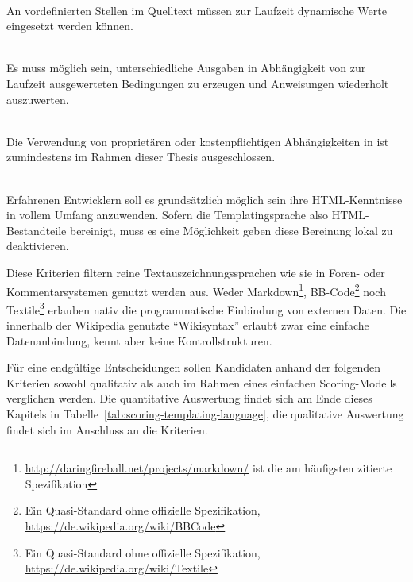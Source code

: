 \begin{description}[noitemsep]
\item[Datenanbindung] \hfill \\
  An vordefinierten Stellen im Quelltext müssen zur Laufzeit dynamische Werte eingesetzt werden können.
\item[Kontrollstrukturen] \hfill \\
  Es muss möglich sein, unterschiedliche Ausgaben in Abhängigkeit von zur Laufzeit ausgewerteten Bedingungen zu erzeugen und Anweisungen wiederholt auszuwerten.
\item[Freie Verfügbarkeit] \hfill \\
  Die Verwendung von proprietären oder kostenpflichtigen Abhängigkeiten in \idename{} ist zumindestens im Rahmen dieser Thesis ausgeschlossen.
\item[Einbettung von reinem HTML] \hfill \\
  Erfahrenen Entwicklern soll es grundsätzlich möglich sein ihre HTML-Kennt\-nisse in vollem Umfang anzuwenden. Sofern die Templatingsprache also HTML-Be\-stand\-teile bereinigt, muss es eine Möglichkeit geben diese Bereinung lokal zu deaktivieren.
\end{description}

Diese Kriterien filtern reine Textauszeichnungssprachen wie sie in Foren- oder Kommentarsystemen genutzt werden aus. Weder Markdown\footnote{\url{http://daringfireball.net/projects/markdown/} ist die am häufigsten zitierte Spezifikation}, BB-Code\footnote{Ein Quasi-Standard ohne offizielle Spezifikation, \url{https://de.wikipedia.org/wiki/BBCode}} noch Textile\footnote{Ein Quasi-Standard ohne offizielle Spezifikation, \url{https://de.wikipedia.org/wiki/Textile}} erlauben nativ die programmatische Einbindung von externen Daten. Die innerhalb der Wikipedia genutzte "`Wikisyntax"' erlaubt zwar eine einfache Datenanbindung, kennt aber keine Kontrollstrukturen.

Für eine endgültige Entscheidungen sollen Kandidaten anhand der folgenden Kriterien sowohl qualitativ als auch im Rahmen eines einfachen Scoring-Modells verglichen werden. Die quantitative Auswertung findet sich am Ende dieses Kapitels in Tabelle~\ref{tab:scoring-templating-language}, die qualitative Auswertung findet sich im Anschluss an die Kriterien.


